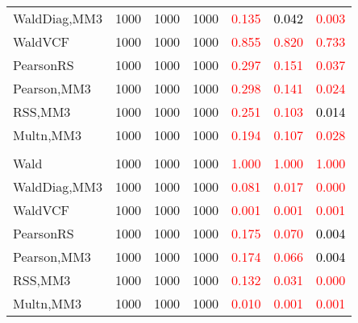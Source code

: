 \documentclass[
]{article}
\begin{document}
\begin{table}[H]
{\begin{tabular}[t]{lrrrrrr}
\hspace{1em}WaldDiag,MM3 & 1000 & 1000 & 1000 & \textcolor{red}{0.135} & \textcolor{black}{0.042} & \textcolor{red}{0.003}\\
\hspace{1em}WaldVCF & 1000 & 1000 & 1000 & \textcolor{red}{0.855} & \textcolor{red}{0.820} & \textcolor{red}{0.733}\\
\hspace{1em}PearsonRS & 1000 & 1000 & 1000 & \textcolor{red}{0.297} & \textcolor{red}{0.151} & \textcolor{red}{0.037}\\
\hspace{1em}Pearson,MM3 & 1000 & 1000 & 1000 & \textcolor{red}{0.298} & \textcolor{red}{0.141} & \textcolor{red}{0.024}\\
\hspace{1em}RSS,MM3 & 1000 & 1000 & 1000 & \textcolor{red}{0.251} & \textcolor{red}{0.103} & \textcolor{black}{0.014}\\
\hspace{1em}Multn,MM3 & 1000 & 1000 & 1000 & \textcolor{red}{0.194} & \textcolor{red}{0.107} & \textcolor{red}{0.028}\\
\addlinespace[0.3em]
\multicolumn{7}{l}{\textbf{3F 15V}}\\
\hspace{1em}Wald & 1000 & 1000 & 1000 & \textcolor{red}{1.000} & \textcolor{red}{1.000} & \textcolor{red}{1.000}\\
\hspace{1em}WaldDiag,MM3 & 1000 & 1000 & 1000 & \textcolor{red}{0.081} & \textcolor{red}{0.017} & \textcolor{red}{0.000}\\
\hspace{1em}WaldVCF & 1000 & 1000 & 1000 & \textcolor{red}{0.001} & \textcolor{red}{0.001} & \textcolor{red}{0.001}\\
\hspace{1em}PearsonRS & 1000 & 1000 & 1000 & \textcolor{red}{0.175} & \textcolor{red}{0.070} & \textcolor{black}{0.004}\\
\hspace{1em}Pearson,MM3 & 1000 & 1000 & 1000 & \textcolor{red}{0.174} & \textcolor{red}{0.066} & \textcolor{black}{0.004}\\
\hspace{1em}RSS,MM3 & 1000 & 1000 & 1000 & \textcolor{red}{0.132} & \textcolor{red}{0.031} & \textcolor{red}{0.000}\\
\hspace{1em}Multn,MM3 & 1000 & 1000 & 1000 & \textcolor{red}{0.010} & \textcolor{red}{0.001} & \textcolor{red}{0.001}\\
\bottomrule
\end{tabular}}
\endgroup{}
\end{table}
\end{document}
